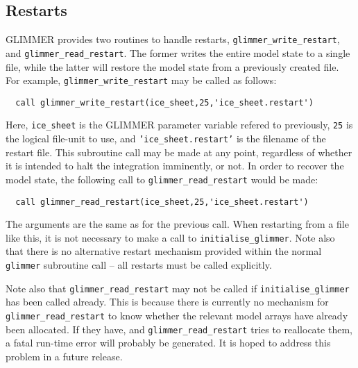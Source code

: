 \subsection{Restarts}
%
GLIMMER provides two routines to handle restarts,
\texttt{glimmer\_write\_restart}, and \texttt{glimmer\_read\_restart}. The
former writes the entire model state to a single file, while the latter will
restore the model state from a previously created
file. For example, \texttt{glimmer\_write\_restart} may be called as follows:
%
\begin{verbatim}
  call glimmer_write_restart(ice_sheet,25,'ice_sheet.restart')
\end{verbatim}
%
Here, \texttt{ice\_sheet} is the GLIMMER parameter variable refered to
previously, \texttt{25} is the logical file-unit to use, and
\texttt{'ice\_sheet.restart'} is the filename of the restart file. This
subroutine call may be made at any point, regardless of whether it is intended
to halt the integration imminently, or not. In order to recover the model
state, the following call to \texttt{glimmer\_read\_restart} would be made:
%
\begin{verbatim}
  call glimmer_read_restart(ice_sheet,25,'ice_sheet.restart')
\end{verbatim}
%
The arguments are the same as for the previous call. When restarting from a
file like this, it is not necessary to make a call to
\texttt{initialise\_glimmer}. Note also that there is no alternative restart mechanism
provided within the normal \texttt{glimmer} subroutine call -- all restarts
must be called explicitly.

Note also that \texttt{glimmer\_read\_restart} may not be called if
\texttt{initialise\_glimmer} has been called already. This is because there is
currently no mechanism for \texttt{glimmer\_read\_restart} to know whether the
relevant model arrays have already been allocated. If they have, and
\texttt{glimmer\_read\_restart} tries to reallocate them, a fatal
run-time error will probably be generated. It is hoped to address this problem
in a future release.
%